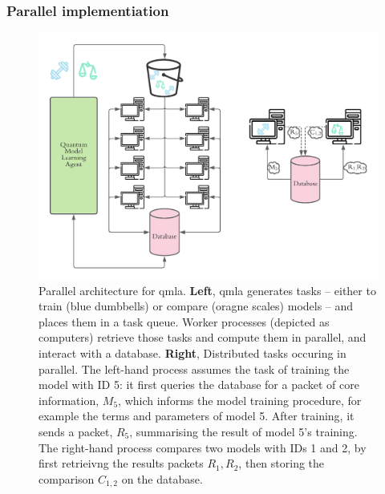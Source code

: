 \subsubsection{Parallel implementiation}\label{sec:parallel}
\begin{figure}
    \includegraphics{algorithms/figures/parallel_architecture.pdf}
    \caption[Parallel architecture for \gls{qmla}]{
        Parallel architecture for \gls{qmla}.
        \textbf{Left}, \gls{qmla} generates tasks 
            -- either to train (blue dumbbells) or compare (oragne scales) models -- 
            and places them in a task queue. 
        Worker processes (depicted as computers) retrieve those tasks and compute them in parallel, 
            and interact with a database. 
        \textbf{Right}, Distributed tasks occuring in parallel. 
        The left-hand process assumes the task of training the model with ID 5:
            it first queries the database for a packet of core information, $M_5$, 
            which informs the model training procedure, for example the terms and parameters 
            of model 5. 
        After training, it sends a packet, $R_5$, summarising the result of model 5's training. 
        The right-hand process compares two models with IDs 1 and 2, by first retrieivng the results packets
            $R_1, R_2$, then storing the comparison $C_{1,2}$ on the database. 
    }
    \label{fig:parallel}
\end{figure}

